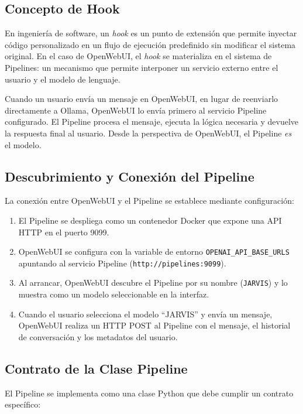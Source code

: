 \subsection{Concepto de Hook}

En ingeniería de software, un \textit{hook} es un punto de extensión que permite inyectar código personalizado en un flujo de ejecución predefinido sin modificar el sistema original. En el caso de OpenWebUI, el \textit{hook} se materializa en el sistema de Pipelines: un mecanismo que permite interponer un servicio externo entre el usuario y el modelo de lenguaje.

Cuando un usuario envía un mensaje en OpenWebUI, en lugar de reenviarlo directamente a Ollama, OpenWebUI lo envía primero al servicio Pipeline configurado. El Pipeline procesa el mensaje, ejecuta la lógica necesaria y devuelve la respuesta final al usuario. Desde la perspectiva de OpenWebUI, el Pipeline \textit{es} el modelo.

\subsection{Descubrimiento y Conexión del Pipeline}

La conexión entre OpenWebUI y el Pipeline se establece mediante configuración:

\begin{enumerate}
    \item El Pipeline se despliega como un contenedor Docker que expone una API HTTP en el puerto 9099.
    \item OpenWebUI se configura con la variable de entorno \texttt{OPENAI\_API\_BASE\_URLS} apuntando al servicio Pipeline (\texttt{http://pipelines:9099}).
    \item Al arrancar, OpenWebUI descubre el Pipeline por su nombre (\texttt{JARVIS}) y lo muestra como un modelo seleccionable en la interfaz.
    \item Cuando el usuario selecciona el modelo ``JARVIS'' y envía un mensaje, OpenWebUI realiza un HTTP POST al Pipeline con el mensaje, el historial de conversación y los metadatos del usuario.
\end{enumerate}

\subsection{Contrato de la Clase Pipeline}

El Pipeline se implementa como una clase Python que debe cumplir un contrato específico:


